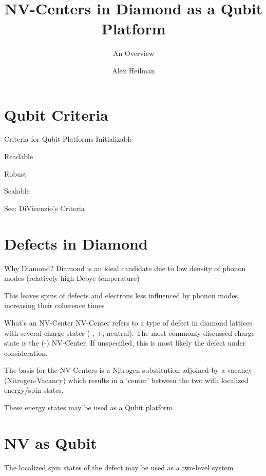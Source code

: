 \documentclass[11pt]{beamer}
\author{Alex Heilman}
\title{NV-Centers in Diamond as a Qubit Platform}
\subtitle{An Overview}
\begin{document}
\begin{frame}
\titlepage
\end{frame}


\section{Qubit Criteria}
\begin{frame}{Criteria for Qubit Platforms}
Initializable

Readable

Robust

Scalable

See: DiVicenzio's Criteria
\end{frame}

\section{Defects in Diamond}
\begin{frame}{Why Diamond?}
Diamond is an ideal candidate due to low density of phonon modes (relatively high Debye temperature)

This leaves spins of defects and electrons less influenced by phonon modes, increasing their coherence times
\end{frame}

\begin{frame}{What's an NV-Center}
NV-Center refers to a type of defect in diamond lattices with several charge states (-, +, neutral). The most commonly discussed charge state is the (-) NV-Center. If unspecified, this is most likely the defect under consideration.

The basis for the NV-Centers is a Nitrogen substitution adjoined by a vacancy (Nitrogen-Vacancy) which results in a 'center' between the two with localized energy/spin  states.

These energy states may be used as a Qubit platform.
\end{frame}

\section{NV as Qubit}
\begin{frame}
The localized spin states of the defect may be used as a two-level system 
\end{frame}
\end{document}
